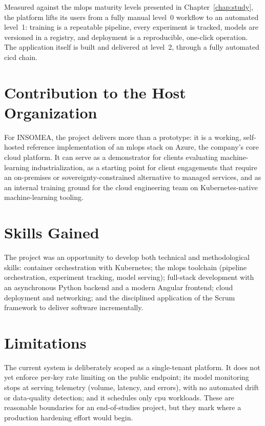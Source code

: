 Measured against the \gls{mlops} maturity levels presented in
Chapter~\ref{chap:study}, the platform lifts its users from a fully manual
level~0 workflow to an automated level~1: training is a repeatable pipeline,
every experiment is tracked, models are versioned in a registry, and deployment
is a reproducible, one-click operation. The application itself is built and
delivered at level~2, through a fully automated \gls{cicd} chain.

\section*{Contribution to the Host Organization}
For INSOMEA, the project delivers more than a prototype: it is a working,
self-hosted reference implementation of an \gls{mlops} stack on Azure, the
company's core cloud platform. It can serve as a demonstrator for clients
evaluating machine-learning industrialization, as a starting point for client
engagements that require an on-premises or sovereignty-constrained alternative to
managed services, and as an internal training ground for the cloud engineering
team on Kubernetes-native machine-learning tooling.

\section*{Skills Gained}
The project was an opportunity to develop both technical and methodological
skills: container orchestration with Kubernetes; the \gls{mlops} toolchain
(pipeline orchestration, experiment tracking, model serving); full-stack
development with an asynchronous Python backend and a modern Angular frontend;
cloud deployment and networking; and the disciplined application of the Scrum
framework to deliver software incrementally.

\section*{Limitations}
The current system is deliberately scoped as a single-tenant platform. It does not
yet enforce per-key rate limiting on the public endpoint; its model monitoring
stops at serving telemetry (volume, latency, and errors), with no automated drift
or data-quality detection; and it schedules only \gls{cpu} workloads. These are
reasonable boundaries for an end-of-studies project, but they mark where a
production hardening effort would begin.

